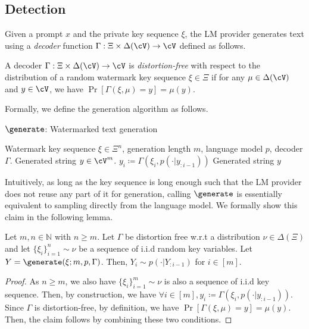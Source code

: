 \subsection{Detection}
%
Given a prompt $x$ and the private key sequence $\xi$, the LM provider generates text using a \emph{decoder} function $\Gamma: \Xi \times \Delta(\cV) \rightarrow \cV$ defined as follows.
%
\begin{definition}
    A decoder $\Gamma: \Xi \times \Delta(\cV) \rightarrow \cV$ is \emph{distortion-free} with respect to the distribution of a random watermark key sequence $\xi \in \Xi$ if for any $\mu \in \Delta(\cV)$ and $y \in \cV$, we have $\Pr[\Gamma(\xi, \mu) = y] = \mu(y)$. 
    \label{def:distortion-free}
\end{definition}
%
Formally, we define the generation algorithm as follows.
%
\begin{algorithm}[t]
%
\caption{$\generate$: Watermarked text generation }\label{alg:generate}
%
\begin{algorithmic}[1]
%
\renewcommand{\algorithmicrequire}{\textbf{Input:}}
\renewcommand{\algorithmicensure}{\textbf{Output:}}
%
\REQUIRE Watermark key sequence $\xi \in \Xi^{n}$, generation length $m$, language model $p$, decoder $\Gamma$.
\ENSURE Generated string $y \in \cV^m$.
%
%
\STATE $y_i \coloneqq \Gamma(\xi_i, p(\cdot | y_{: i-1}))$
%
\ENDFOR
%
\RETURN Generated string $y$
\end{algorithmic}
\end{algorithm}
%
Intuitively, as long as the key sequence is long enough such that the LM provider does not reuse any part of it for generation, calling $\generate$ is essentially equivalent to sampling directly from the language model. We formally show this claim in the following lemma.
%
\begin{lemma}
    Let $m, n \in \mathbb{N}$ with $n \geq m$. Let $\Gamma$ be distortion free w.r.t a distribution $\nu \in \Delta(\Xi)$ and let $\{ \xi_{i} \}_{i = 1}^{n} \sim \nu$ be a sequence of i.i.d random key variables. Let $Y = \generate(\xi; m, p, \Gamma)$. Then, $Y_i \sim p(\cdot | Y_{: i-1})$ for $i \in [m]$.   
\end{lemma}
%
\begin{proof}
%
    As $n \geq m$, we also have $\{ \xi_i \}_{i=1}^m \sim \nu$ is also a sequence of i.i.d key sequence. Then, by construction, we have $\forall i \in [m], y_i \coloneqq \Gamma(\xi_i, p(\cdot | y_{: i-1}))$. Since $\Gamma$ is distortion-free, by definition, we have $\Pr[\Gamma(\xi, \mu) = y] = \mu(y)$. Then, the claim follows by combining these two conditions. 
%
\end{proof}
